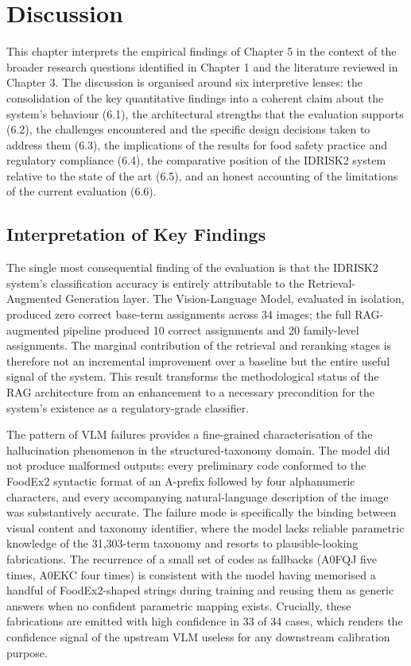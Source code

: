 \hypertarget{discussion}{%
\chapter{Discussion}\label{discussion}}

This chapter interprets the empirical findings of Chapter 5 in the context of the broader research questions identified in Chapter 1 and the literature reviewed in Chapter 3. The discussion is organised around six interpretive lenses: the consolidation of the key quantitative findings into a coherent claim about the system's behaviour (6.1), the architectural strengths that the evaluation supports (6.2), the challenges encountered and the specific design decisions taken to address them (6.3), the implications of the results for food safety practice and regulatory compliance (6.4), the comparative position of the IDRISK2 system relative to the state of the art (6.5), and an honest accounting of the limitations of the current evaluation (6.6).

\hypertarget{interpretation-of-key-findings}{%
\section{Interpretation of Key Findings}\label{interpretation-of-key-findings}}

The single most consequential finding of the evaluation is that the IDRISK2 system's classification accuracy is entirely attributable to the Retrieval-Augmented Generation layer. The Vision-Language Model, evaluated in isolation, produced zero correct base-term assignments across 34 images; the full RAG-augmented pipeline produced 10 correct assignments and 20 family-level assignments. The marginal contribution of the retrieval and reranking stages is therefore not an incremental improvement over a baseline but the entire useful signal of the system. This result transforms the methodological status of the RAG architecture from an enhancement to a necessary precondition for the system's existence as a regulatory-grade classifier.

The pattern of VLM failures provides a fine-grained characterisation of the hallucination phenomenon in the structured-taxonomy domain. The model did not produce malformed outputs: every preliminary code conformed to the FoodEx2 syntactic format of an A-prefix followed by four alphanumeric characters, and every accompanying natural-language description of the image was substantively accurate. The failure mode is specifically the binding between visual content and taxonomy identifier, where the model lacks reliable parametric knowledge of the 31,303-term taxonomy and resorts to plausible-looking fabrications. The recurrence of a small set of codes as fallbacks (A0FQJ five times, A0EKC four times) is consistent with the model having memorised a handful of FoodEx2-shaped strings during training and reusing them as generic answers when no confident parametric mapping exists. Crucially, these fabrications are emitted with high confidence in 33 of 34 cases, which renders the confidence signal of the upstream VLM useless for any downstream calibration purpose.

